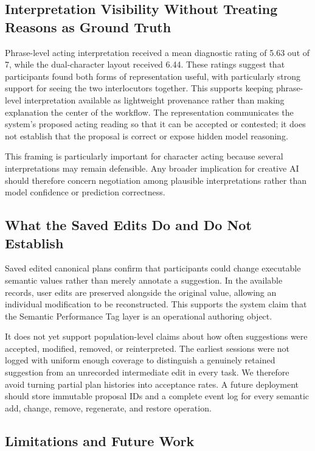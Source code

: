\subsection{Interpretation Visibility Without Treating Reasons as Ground Truth}

Phrase-level acting interpretation received a mean diagnostic rating of 5.63 out of 7, while the dual-character layout received 6.44. These ratings suggest that participants found both forms of representation useful, with particularly strong support for seeing the two interlocutors together. This supports keeping phrase-level interpretation available as lightweight provenance rather than making explanation the center of the workflow. The representation communicates the system's proposed acting reading so that it can be accepted or contested; it does not establish that the proposal is correct or expose hidden model reasoning.

This framing is particularly important for character acting because several interpretations may remain defensible. Any broader implication for creative AI should therefore concern negotiation among plausible interpretations rather than model confidence or prediction correctness.

\subsection{What the Saved Edits Do and Do Not Establish}

Saved edited canonical plans confirm that participants could change executable semantic values rather than merely annotate a suggestion. In the available records, user edits are preserved alongside the original value, allowing an individual modification to be reconstructed. This supports the system claim that the Semantic Performance Tag layer is an operational authoring object.

It does not yet support population-level claims about how often suggestions were accepted, modified, removed, or reinterpreted. The earliest sessions were not logged with uniform enough coverage to distinguish a genuinely retained suggestion from an unrecorded intermediate edit in every task. We therefore avoid turning partial plan histories into acceptance rates. A future deployment should store immutable proposal IDs and a complete event log for every semantic add, change, remove, regenerate, and restore operation.

\subsection{Limitations and Future Work}

